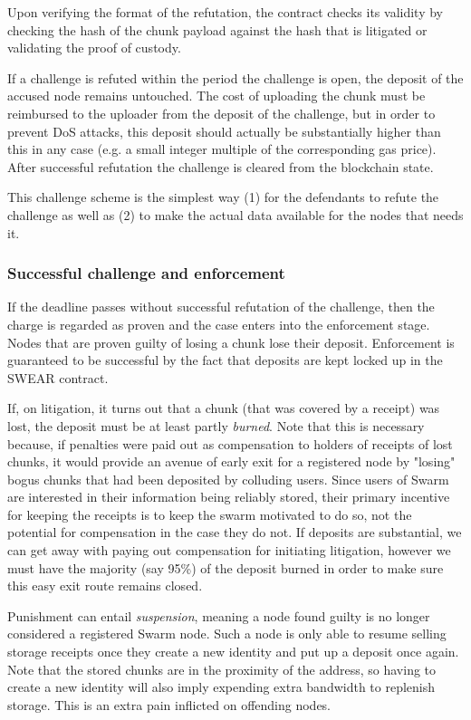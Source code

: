 Upon verifying the format of the refutation, the contract checks its validity by checking the hash of the chunk payload against the hash that is litigated or validating the proof of custody. 

If a challenge is refuted within the period the challenge is open, the deposit of the accused node remains untouched. The cost of uploading the chunk must be reimbursed to the uploader from the deposit of the challenge, but in order to prevent DoS attacks, this deposit should actually be substantially higher than this in any case (e.g. a small integer multiple of the corresponding gas price). After successful refutation the challenge is cleared from the blockchain state.

This challenge scheme is the simplest way (1) for the defendants to refute the challenge as well as (2) to make the actual data available for the nodes that needs it.

\subsubsection{Successful challenge and enforcement}

If the deadline passes without successful refutation of the challenge, then the charge is regarded as proven and the case enters into the enforcement stage. Nodes that are proven guilty of losing a chunk lose their deposit. Enforcement is guaranteed to be successful by the fact that deposits are kept locked up in the SWEAR contract.

If, on litigation, it turns out that a chunk (that was covered by a receipt) was lost, the deposit must be at least partly \emph{burned}. Note that this is necessary because, if penalties were paid out as compensation to holders of receipts of lost chunks, it would provide an avenue of early exit for a registered node by "losing" bogus chunks that had been deposited by colluding users. Since users of Swarm are interested in their information being reliably stored, their primary incentive for keeping the receipts is to keep the swarm motivated to do so, not the potential for compensation in the case they do not. If deposits are substantial, we can get away with paying out compensation for initiating litigation, however we must have the majority (say 95\%) of the deposit burned in order to make sure this easy exit route remains closed.

Punishment can entail \emph{suspension}, meaning a node found guilty is no longer considered a registered Swarm node. Such a node is only able to resume selling storage receipts once they create a new identity and put up a deposit once again. Note that the stored chunks are in the proximity of the address, so having to create a new identity will also imply expending extra bandwidth to replenish storage. This is an extra pain inflicted on offending nodes.


